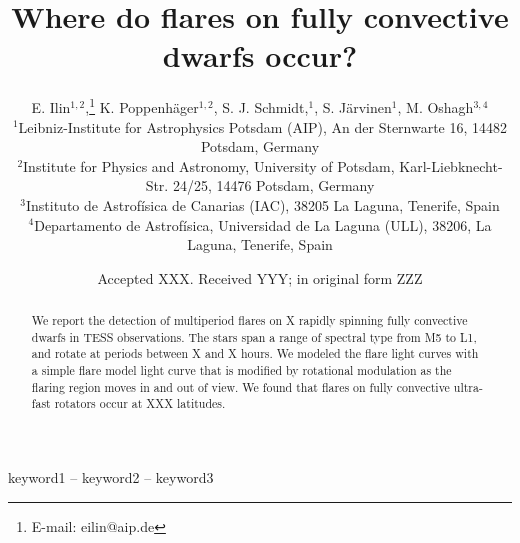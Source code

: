 \documentclass[fleqn,usenatbib,letters]{mnras}%
\title[Where do flares on fully convective dwarfs occur?]{Where do flares on fully convective dwarfs occur?}
\author[E. Ilin et al.]{
E. Ilin$^{1,2}$,\thanks{E-mail: eilin@aip.de}
K. Poppenh\"ager$^{1,2}$,
S. J. Schmidt,$^{1}$,
S. J\"arvinen$^{1}$,
M. Oshagh$^{3,4}$
\\
$^{1}$Leibniz-Institute for Astrophysics Potsdam (AIP), An der Sternwarte 16, 14482 Potsdam, Germany\\
$^{2}$Institute for Physics and Astronomy, University of Potsdam, Karl-Liebknecht-Str. 24/25, 14476 Potsdam, Germany\\
$^{3}$Instituto de Astrofísica de Canarias (IAC), 38205 La Laguna, Tenerife, Spain\\
$^{4}$Departamento de Astrofísica, Universidad de La Laguna (ULL), 38206, La Laguna, Tenerife, Spain
}
\date{Accepted XXX. Received YYY; in original form ZZZ}
\begin{document}
\label{firstpage}
\pagerange{\pageref{firstpage}--\pageref{lastpage}}
\maketitle

\begin{abstract}
We report the detection of multiperiod flares on X rapidly spinning fully convective dwarfs in TESS observations. The stars span a range of spectral type from M5 to L1, and rotate at periods between X and X hours. We modeled the flare light curves with a simple flare model light curve that is modified by rotational modulation as the flaring region moves in and out of view. We found that flares on fully convective ultra-fast rotators occur at XXX latitudes.
\end{abstract}

\begin{keywords}
keyword1 -- keyword2 -- keyword3
\end{keywords}




\end{document}
